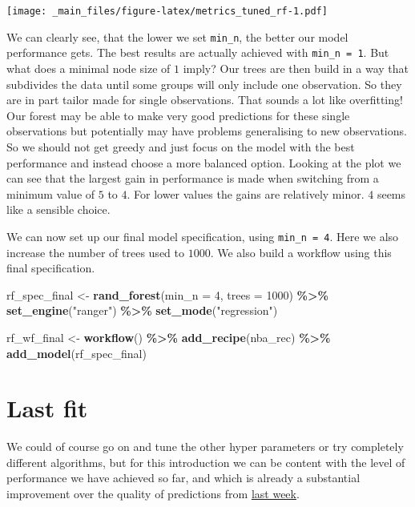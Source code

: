 \documentclass[
]{book}
\newenvironment{Shaded}{\begin{snugshade}}{\end{snugshade}}
\newcommand{\AttributeTok}[1]{\textcolor[rgb]{0.13,0.29,0.53}{#1}}
\newcommand{\DecValTok}[1]{\textcolor[rgb]{0.00,0.00,0.81}{#1}}
\newcommand{\FunctionTok}[1]{\textcolor[rgb]{0.13,0.29,0.53}{\textbf{#1}}}
\newcommand{\NormalTok}[1]{#1}
\newcommand{\OtherTok}[1]{\textcolor[rgb]{0.56,0.35,0.01}{#1}}
\newcommand{\SpecialCharTok}[1]{\textcolor[rgb]{0.81,0.36,0.00}{\textbf{#1}}}
\newcommand{\StringTok}[1]{\textcolor[rgb]{0.31,0.60,0.02}{#1}}
\begin{document}
\texttt{[image: \_main\_files/figure-latex/metrics\_tuned\_rf-1.pdf]}

We can clearly see, that the lower we set \texttt{min\_n}, the better our model
performance gets. The best results are actually achieved with \texttt{min\_n\ =\ 1}.
But what does a minimal node size of \(1\) imply? Our trees are then build in a
way that subdivides the data until some groups will only include one
observation. So they are in part tailor made for single observations.
That sounds a lot like overfitting! Our forest may be able to make very
good predictions for these single observations but potentially may have problems
generalising to new observations. So we should not get greedy and just focus on
the model with the best performance and instead choose a more balanced option.
Looking at the plot we can see that the largest gain in performance is made when
switching from a minimum value of \(5\) to \(4\). For lower values the gains are
relatively minor. \(4\) seems like a sensible choice.

We can now set up our final model specification, using \texttt{min\_n\ =\ 4}. Here we also
increase the number of trees used to \(1000\). We also build a workflow using this
final specification.

\begin{Shaded}
\begin{Highlighting}[]
\NormalTok{rf\_spec\_final }\OtherTok{\textless{}{-}} \FunctionTok{rand\_forest}\NormalTok{(}\AttributeTok{min\_n =} \DecValTok{4}\NormalTok{, }\AttributeTok{trees =} \DecValTok{1000}\NormalTok{) }\SpecialCharTok{\%\textgreater{}\%} 
  \FunctionTok{set\_engine}\NormalTok{(}\StringTok{"ranger"}\NormalTok{) }\SpecialCharTok{\%\textgreater{}\%} 
  \FunctionTok{set\_mode}\NormalTok{(}\StringTok{"regression"}\NormalTok{)}

\NormalTok{rf\_wf\_final }\OtherTok{\textless{}{-}} \FunctionTok{workflow}\NormalTok{() }\SpecialCharTok{\%\textgreater{}\%} 
  \FunctionTok{add\_recipe}\NormalTok{(nba\_rec) }\SpecialCharTok{\%\textgreater{}\%} 
  \FunctionTok{add\_model}\NormalTok{(rf\_spec\_final)}
\end{Highlighting}
\end{Shaded}

\hypertarget{last-fit}{%
\section{Last fit}\label{last-fit}}

We could of course go on and tune the other hyper parameters or try completely
different algorithms, but for this introduction we can be content with the level
of performance we have achieved so far, and which is already a substantial
improvement over the quality of predictions from \protect\hyperlink{pm-t}{last week}.
\end{document}
